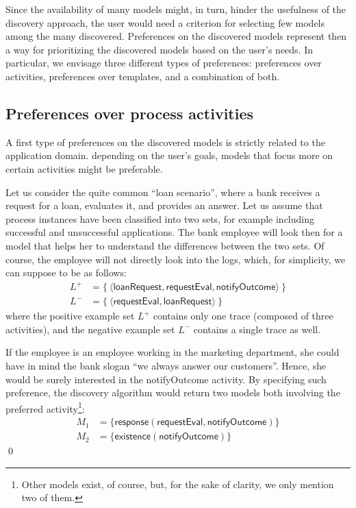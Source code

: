 Since the availability of many models might, in turn, hinder the usefulness of the discovery approach, the  user would need a criterion for selecting few models among the many discovered.
%
Preferences on the discovered models represent then a way for prioritizing the discovered models based on the  user's needs. In particular, we envisage three different types of preferences: preferences over activities, preferences over templates, and a combination of both.



\subsection{Preferences over process activities}
\label{subsec:prefOverActivities}

A first type of preferences on the discovered models is strictly related to the application domain.   depending on the  user's goals, models that focus more on certain activities might be preferable.

\begin{example}
\label{ex:prefOverActivities}
Let us consider the quite common ``loan scenario'', where a bank receives a request for a loan, evaluates it, and provides an answer. Let us assume that process instances have been classified into two sets, for example including successful and unsuccessful applications. The bank employee will look then for a model that helps her to understand the differences between the two sets. Of course, the employee will not directly look into the logs, which, for simplicity, we can suppose to be as follows:
%
\begin{align*}
L^{+}& = \{\ \langle \mathsf{loanRequest}, \mathsf{requestEval}, \mathsf{notifyOutcome} \rangle \ \} \\
L^- & = \{\ \langle \mathsf{requestEval}, \mathsf{loanRequest} \rangle \ \}
\end{align*}
%
where the positive example set $L^+$ %
contains only one trace (composed of
 three activities), and the negative example set $L^-$ %
 contains a single trace as well.

\noindent If the employee is an employee working in the marketing department, she could have in mind the bank slogan ``we always answer our customers''. Hence, she would be surely interested in the \textsf{notifyOutcome} activity. By specifying such preference, the discovery algorithm would return two models both involving the preferred activity\footnote{Other models exist, of course, but, for the sake of clarity, we only mention two of them.}:
%
\begin{align*}
M_1 & = \{ \mathsf{response(requestEval, notifyOutcome)}\} \\
M_2 & = \{ \mathsf{existence(notifyOutcome)}\}
\end{align*}
%
\qed
%
\end{example}

